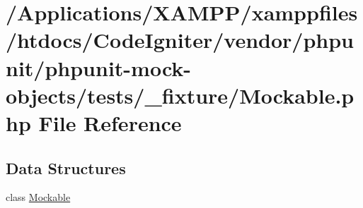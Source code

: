 \hypertarget{mock-objects_2tests_2__fixture_2_mockable_8php}{}\section{/\+Applications/\+X\+A\+M\+P\+P/xamppfiles/htdocs/\+Code\+Igniter/vendor/phpunit/phpunit-\/mock-\/objects/tests/\+\_\+fixture/\+Mockable.php File Reference}
\label{mock-objects_2tests_2__fixture_2_mockable_8php}
\subsection*{Data Structures}
\begin{DoxyCompactItemize}
\item 
class \mbox{\hyperlink{class_mockable}{Mockable}}
\end{DoxyCompactItemize}
